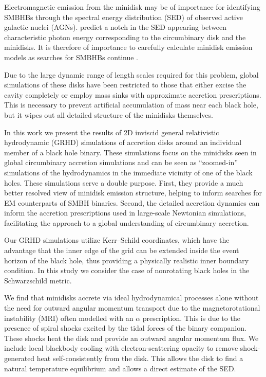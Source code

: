 Electromagnetic emission from the minidisk may be of importance for identifying SMBHBs through the spectral energy distribution (SED) of observed active galactic nuclei (AGNs). \cite{Roedig14} predict a notch in the SED appearing between characteristic photon energy corresponding to the circumbinary disk and the minidisks. It is therefore of importance to carefully calculate minidisk emission models as searches for SMBHBs continue \citep{Runnoe15,Li16,Charisi16}.

Due to the large dynamic range of length scales required for this problem, global simulations of these disks have been restricted to those that either excise the cavity completely or employ mass sinks with approximate accretion prescriptions.  This is necessary to prevent artificial accumulation of mass near each black hole, but it wipes out all detailed structure of the minidisks themselves.

In this work we present the results of 2D inviscid general relativistic hydrodynamic (GRHD) simulations of accretion disks around an individual member of a black hole binary. These simulations focus on the minidisks seen in global circumbinary accretion simulations and can be seen as ``zoomed-in'' simulations of the hydrodynamics in the immediate vicinity of one of the black holes.  These simulations serve a double purpose. First, they provide a much better resolved view of minidisk emission structure, helping to inform searches for EM counterparts of SMBH binaries.  Second, the detailed accretion dynamics can inform the accretion prescriptions used in large-scale Newtonian simulations, facilitating the approach to a global understanding of circumbinary accretion.

Our GRHD simulations utilize Kerr--Schild coordinates, which have the advantage that the inner edge of the grid can be extended inside the event horizon of the black hole, thus providing a physically realistic inner boundary condition. In this study we consider the case of nonrotating black holes in the Schwarzschild metric.

  We find that minidisks accrete via ideal hydrodynamical processes alone without the need for outward angular momentum transport due to the magnetorotational instability (MRI) often modelled with an $\alpha$ prescription.
This is due to the presence of spiral shocks excited by the tidal forces of the binary companion. These shocks heat the disk and provide an outward angular momentum flux. We include local 
blackbody cooling with electron-scattering opacity to remove shock-generated
heat self-consistently from the disk.  This allows the disk to find a natural
temperature equilibrium and allows a direct estimate of the SED.

